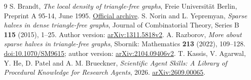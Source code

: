 \documentclass[11pt]{article}
\begin{document}
\begin{thebibliography}{9}
S. Brandt,
\emph{The local density of triangle-free graphs},
Freie Universit\"at Berlin, Preprint A 95-14, June 1995.
\href{https://ftp.mi.fu-berlin.de/pub/math/publ/pre/1995/index.html}{Official archive}.
S. Norin and L. Yepremyan,
\emph{Sparse halves in dense triangle-free graphs},
Journal of Combinatorial Theory, Series B \textbf{115} (2015), 1--25.
Author version: \href{https://arxiv.org/abs/1311.5818v2}{arXiv:1311.5818v2}.
A. Razborov,
\emph{More about sparse halves in triangle-free graphs},
Sbornik: Mathematics \textbf{213} (2022), 109--128.
\href{https://doi.org/10.1070/SM9615}{doi:10.1070/SM9615};
author version: \href{https://arxiv.org/abs/2104.09406v2}{arXiv:2104.09406v2}.
T. Kassis, V. Agarwal, Y. He, D. Patel and A. M. Brueckner,
\emph{Scientific Agent Skills: A Library of Procedural Knowledge for Research Agents},
2026. \href{https://doi.org/10.48550/arXiv.2609.00065}{arXiv:2609.00065}.
\end{thebibliography}
\end{document}

